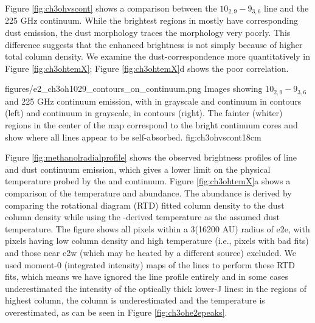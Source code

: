 \documentclass{emulateapj}
\begin{document}
Figure \ref{fig:ch3ohvscont} shows a comparison between the \methanol
$10_{2,9}-9_{3,6}$ line and the 225 GHz continuum.  While the brightest regions
in \methanol mostly have corresponding dust emission, the dust morphology
traces the \methanol morphology very poorly.  This difference suggests that the
enhanced brightness is not simply because of higher total column density.
We examine the dust-\methanol correspondence more quantitatively in Figure
\ref{fig:ch3ohtemX}; Figure \ref{fig:ch3ohtemX}d shows the poor correlation.

          {figures/e2_ch3oh1029_contours_on_continuum.png}
{Images showing \methanol $10_{2,9}-9_{3,6}$ and 225 GHz continuum emission,
with \methanol in grayscale and continuum in contours (left) and continuum in
grayscale, \methanol in contours (right).  The fainter (whiter) regions in the center
of the \methanol map correspond to the bright continuum cores and show where all lines
appear to be self-absorbed.}
{fig:ch3ohvscont}{1}{8cm}

Figure \ref{fig:methanolradialprofile} shows the observed brightness profiles
of \methanol line and dust continuum emission, which gives a lower limit on
the physical temperature probed by the \methanol and continuum.
Figure \ref{fig:ch3ohtemX}a shows a comparison of the \methanol temperature and
abundance.  The \methanol abundance is derived by comparing the rotational
diagram (RTD) fitted \methanol column density to the dust column density while
using the \methanol-derived temperature as the assumed dust temperature.  The
figure shows all pixels within a 3\arcsec (16200 AU) radius of e2e, with pixels
having low column density and high temperature (i.e., pixels with bad fits) and
those near e2w (which may be heated by a different source) excluded.  We used
moment-0 (integrated intensity) maps of the \methanol lines to perform these
RTD fits, which means we have ignored the line profile entirely and in some
cases underestimated the intensity of the optically thick lower-J lines: in the
regions of highest column, the column is  underestimated and the temperature is
overestimated, as can be seen in Figure \ref{fig:ch3ohe2epeaks}.  
\end{document}
